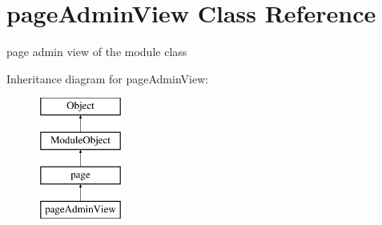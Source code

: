 \hypertarget{classpageAdminView}{\section{page\-Admin\-View Class Reference}
\label{classpageAdminView}
}


page admin view of the module class  


Inheritance diagram for page\-Admin\-View\-:\begin{figure}[H]
\begin{center}
\leavevmode
\includegraphics[height=4.000000cm]{classpageAdminView}
\end{center}
\end{figure}
